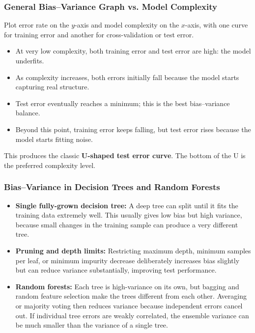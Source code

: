 \documentclass[12pt,openany]{book}
\begin{document}
\subsubsection{General Bias--Variance Graph vs. Model Complexity}

Plot error rate on the \(y\)-axis and model complexity on the \(x\)-axis, with one curve for training error and another for cross-validation or test error.

\begin{itemize}[leftmargin=*]
    \item At very low complexity, both training error and test error are high: the model underfits.
    \item As complexity increases, both errors initially fall because the model starts capturing real structure.
    \item Test error eventually reaches a minimum; this is the best bias--variance balance.
    \item Beyond this point, training error keeps falling, but test error rises because the model starts fitting noise.
\end{itemize}

This produces the classic \textbf{U-shaped test error curve}. The bottom of the U is the preferred complexity level.

\subsubsection{Bias--Variance in Decision Trees and Random Forests}

\begin{itemize}[leftmargin=*]
    \item \textbf{Single fully-grown decision tree:} A deep tree can split until it fits the training data extremely well. This usually gives low bias but high variance, because small changes in the training sample can produce a very different tree.
    \item \textbf{Pruning and depth limits:} Restricting maximum depth, minimum samples per leaf, or minimum impurity decrease deliberately increases bias slightly but can reduce variance substantially, improving test performance.
    \item \textbf{Random forests:} Each tree is high-variance on its own, but bagging and random feature selection make the trees different from each other. Averaging or majority voting then reduces variance because independent errors cancel out. If individual tree errors are weakly correlated, the ensemble variance can be much smaller than the variance of a single tree.
\end{itemize}
\end{document}
